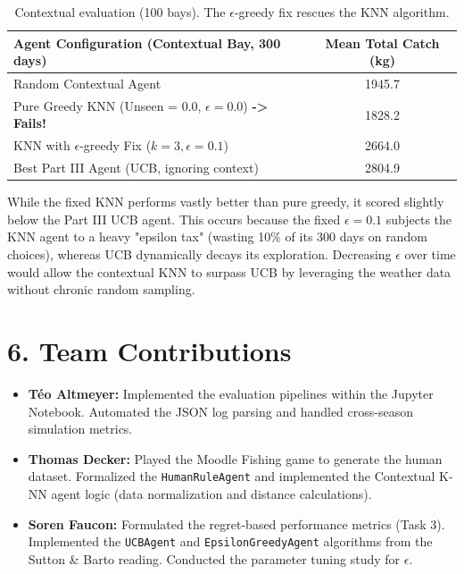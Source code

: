 \documentclass[11pt, a4paper]{article}
\begin{document}
\begin{table}[h]
\centering
\begin{tabular}{l c}
\toprule
\textbf{Agent Configuration (Contextual Bay, 300 days)} & \textbf{Mean Total Catch (kg)} \\
\midrule
Random Contextual Agent & 1945.7 \\
Pure Greedy KNN (Unseen = 0.0, $\epsilon = 0.0$) \textbf{-> Fails!} & 1828.2 \\
KNN with $\epsilon$-greedy Fix ($k=3, \epsilon=0.1$) & 2664.0 \\
Best Part III Agent (UCB, ignoring context) & 2804.9 \\
\bottomrule
\end{tabular}
\caption{Contextual evaluation (100 bays). The $\epsilon$-greedy fix rescues the KNN algorithm.}
\label{tab:contextual}
\end{table}

While the fixed KNN performs vastly better than pure greedy, it scored slightly below the Part III UCB agent. This occurs because the fixed $\epsilon=0.1$ subjects the KNN agent to a heavy "epsilon tax" (wasting 10\% of its 300 days on random choices), whereas UCB dynamically decays its exploration. Decreasing $\epsilon$ over time would allow the contextual KNN to surpass UCB by leveraging the weather data without chronic random sampling.

\section*{6. Team Contributions}
\begin{itemize}
    \item \textbf{Téo Altmeyer:} Implemented the evaluation pipelines within the Jupyter Notebook. Automated the JSON log parsing and handled cross-season simulation metrics.
    \item \textbf{Thomas Decker:} Played the Moodle Fishing game to generate the human dataset. Formalized the \texttt{HumanRuleAgent} and implemented the Contextual K-NN agent logic (data normalization and distance calculations).
    \item \textbf{Soren Faucon:} Formulated the regret-based performance metrics (Task 3). Implemented the \texttt{UCBAgent} and \texttt{EpsilonGreedyAgent} algorithms from the Sutton \& Barto reading. Conducted the parameter tuning study for $\epsilon$.
\end{itemize}
\end{document}
